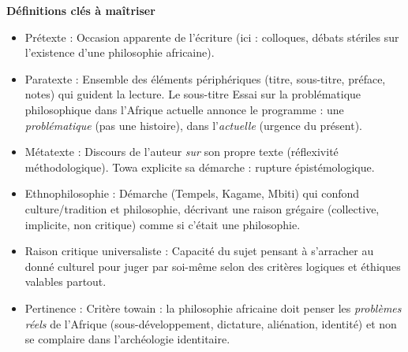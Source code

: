 \documentclass[11pt]{article}
\newcommand{\cle}[1]{{\popxbold\color{popdark}#1}}
\begin{document}
\begin{bilan}
\textbf{Définitions clés à maîtriser}
\begin{itemize}
    \item \cle{Prétexte} : Occasion apparente de l'écriture (ici : colloques, débats stériles sur l'existence d'une philosophie africaine).
    \item \cle{Paratexte} : Ensemble des éléments périphériques (titre, sous-titre, préface, notes) qui guident la lecture. Le sous-titre \guillemotleft Essai sur la problématique philosophique dans l'Afrique actuelle \guillemotright annonce le programme : une \emph{problématique} (pas une histoire), dans l'\emph{actuelle} (urgence du présent).
    \item \cle{Métatexte} : Discours de l'auteur \emph{sur} son propre texte (réflexivité méthodologique). Towa explicite sa démarche : rupture épistémologique.
    \item \cle{Ethnophilosophie} : Démarche (Tempels, Kagame, Mbiti) qui confond culture/tradition et philosophie, décrivant une \cle{raison grégaire} (collective, implicite, non critique) comme si c'était une philosophie.
    \item \cle{Raison critique universaliste} : Capacité du sujet pensant à s'arracher au donné culturel pour juger par soi-même selon des critères logiques et éthiques valables partout.
    \item \cle{Pertinence} : Critère towain : la philosophie africaine doit penser les \emph{problèmes réels} de l'Afrique (sous-développement, dictature, aliénation, identité) et non se complaire dans l'archéologie identitaire.
\end{itemize}


\end{bilan}
\end{document}
